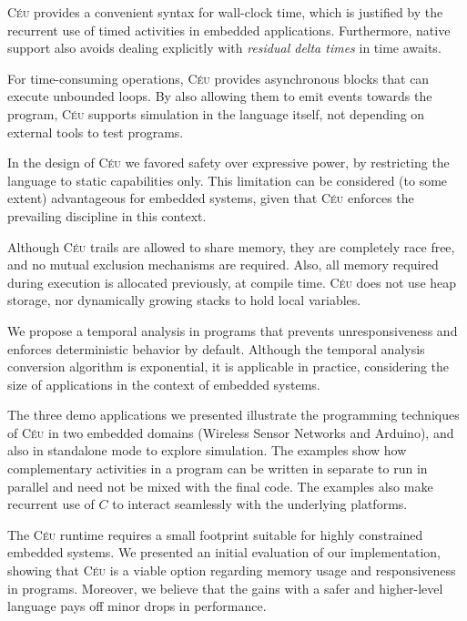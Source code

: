 \documentclass{sigplan-proc}
\newcommand{\2}{\;\;}
\newcommand{\5}{\;\;\;\;\;}
\newcommand{\CEU}{\textsc{C\'{e}u}}
\begin{document}
\CEU{} provides a convenient syntax for wall-clock time, which is justified by 
the recurrent use of timed activities in embedded applications.
Furthermore, native support also avoids dealing explicitly with \emph{residual 
delta times} in time awaits.

For time-consuming operations, \CEU{} provides asynchronous blocks that can 
execute unbounded loops.
By also allowing them to emit events towards the program, \CEU{} supports 
simulation in the language itself, not depending on external tools to test 
programs.

In the design of \CEU{} we favored safety over expressive power, by restricting 
the language to static capabilities only.
This limitation can be considered (to some extent) advantageous for embedded 
systems, given that \CEU{} enforces the prevailing discipline in this context.

Although \CEU{} trails are allowed to share memory, they are completely race 
free, and no mutual exclusion mechanisms are required.
Also, all memory required during execution is allocated previously, at compile 
time.
\CEU{} does not use heap storage, nor dynamically growing stacks to hold local 
variables.

We propose a temporal analysis in programs that prevents unresponsiveness and 
enforces deterministic behavior by default.
Although the temporal analysis conversion algorithm is exponential, it is 
applicable in practice, considering the size of applications in the context of 
embedded systems.


The three demo applications we presented illustrate the programming techniques 
of \CEU{} in two embedded domains (Wireless Sensor Networks and Arduino), and 
also in standalone mode to explore simulation.
The examples show how complementary activities in a program can be written in 
separate to run in parallel and need not be mixed with the final code.
The examples also make recurrent use of $C$ to interact seamlessly with the 
underlying platforms.

The \CEU{} runtime requires a small footprint suitable for highly constrained 
embedded systems.
We presented an initial evaluation of our implementation, showing that \CEU{} 
is a viable option regarding memory usage and responsiveness in programs.
Moreover, we believe that the gains with a safer and higher-level language pays 
off minor drops in performance.
\end{document}
